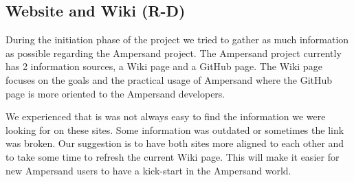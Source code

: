 
\subsection{Website and Wiki (R-D)}
\label{recommendations:website}
During the initiation phase of the project we tried to gather as much information as possible regarding the Ampersand project.
The Ampersand project currently has 2 information sources, a Wiki page and a GitHub page.
The Wiki page focuses on the goals and the practical usage of Ampersand where the GitHub page is more oriented to the Ampersand developers.

We experienced that is was not always easy to find the information we were looking for on these sites.
Some information was outdated or sometimes the link was broken. 
Our suggestion is to have both sites more aligned to each other and to take some time to refresh the current Wiki page.
This will make it easier for new Ampersand users to have a kick-start in the Ampersand world.
